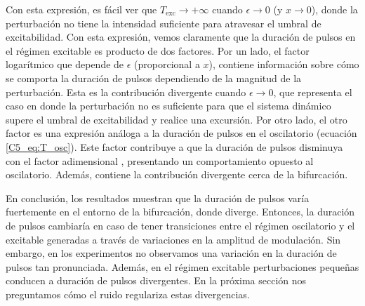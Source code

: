 \documentclass[./main.tex]{subfiles}
\begin{document}
Con esta expresión, es fácil ver que $T_{\text{exc}} \rightarrow +\infty$ cuando $\epsilon \rightarrow 0$ (y $x \rightarrow 0$), donde la perturbación no tiene la intensidad suficiente para atravesar el umbral de excitabilidad. Con esta expresión, vemos claramente que la duración de pulsos en el régimen excitable es producto de dos factores. Por un lado, el factor logarítmico que depende de $\epsilon$ (proporcional a $x$), contiene información sobre cómo se comporta la duración de pulsos dependiendo de la magnitud de la perturbación. Esta es la contribución divergente cuando $\epsilon \rightarrow 0$, que representa el caso en donde la perturbación no es suficiente para que el sistema dinámico supere el umbral de excitabilidad y realice una excursión. Por otro lado, el otro factor es una expresión análoga a la duración de pulsos en el oscilatorio (ecuación \ref{C5_eq:T_osc}). Este factor contribuye a que la duración de pulsos disminuya con el factor adimensional \dddelta, presentando un comportamiento opuesto al oscilatorio. Además, contiene la contribución divergente cerca de la bifurcación. 

En conclusión, los resultados muestran que la duración de pulsos varía fuertemente en el entorno de la bifurcación, donde diverge. Entonces, la duración de pulsos cambiaría en caso de tener transiciones entre el régimen oscilatorio y el excitable generadas a través de variaciones en la amplitud de modulación. Sin embargo, en los experimentos no observamos una variación en la duración de pulsos tan pronunciada. Además, en el régimen excitable perturbaciones pequeñas conducen a duración de pulsos divergentes. En la próxima sección nos preguntamos cómo el ruido regulariza estas divergencias.
\end{document}
